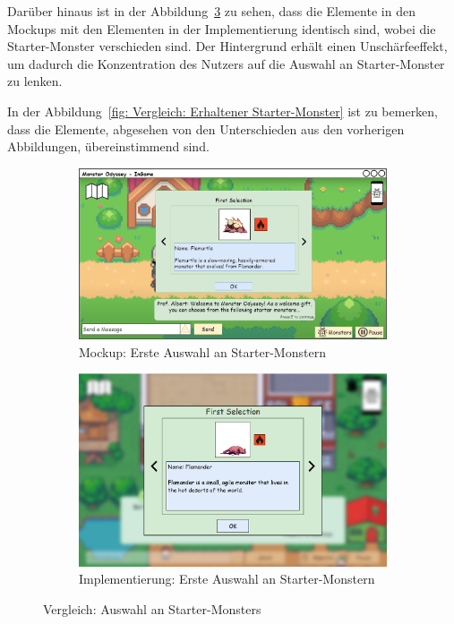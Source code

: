 Darüber hinaus ist in der Abbildung~\ref{fig: Vergleich: Auswahl an Starter-Monsters} zu sehen, dass die Elemente in den Mockups mit den Elementen in der Implementierung identisch sind, wobei die Starter-Monster verschieden sind. Der Hintergrund erhält einen Unschärfeeffekt, um dadurch die Konzentration des Nutzers auf die Auswahl an Starter-Monster zu lenken.

In der Abbildung~\ref{fig: Vergleich: Erhaltener Starter-Monster} ist zu bemerken, dass die Elemente, abgesehen von den Unterschieden aus den vorherigen Abbildungen, übereinstimmend sind. 
\begin{figure}[H]
    \centering
    \begin{subfigure}[b]{0.4\textwidth}
        \includegraphics[width=\textwidth]{images/mockups/Starter/PlayerAndProfMonsterSelection}
        \caption{Mockup: Erste Auswahl an Starter-Monstern}
        \label{fig: Mockup: Erste Auswahl an Starter-Monstern}
    \end{subfigure}
    \hfill
    \begin{subfigure}[b]{0.4\textwidth}
        \includegraphics[width=\textwidth]{images/implementation/Starter/Starter selection implementation.png}
        \caption{Implementierung: Erste Auswahl an Starter-Monstern}
        \label{fig: Implementierung: Erste Auswahl an Starter-Monstern}
    \end{subfigure}
    \caption{Vergleich: Auswahl an Starter-Monsters}
    \label{fig: Vergleich: Auswahl an Starter-Monsters}
\end{figure}
